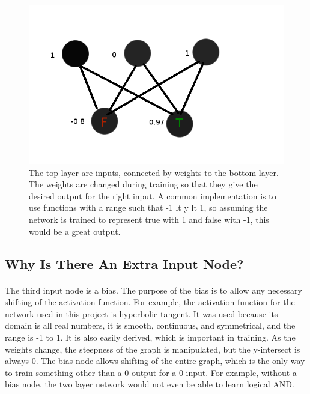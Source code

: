 \documentclass{article}
\begin{document}
    \begin{figure}
        \centering
        \includegraphics[scale=0.4]{images/perceptron.png}
        \caption{The top layer are inputs, connected by weights to the bottom 
            layer. The weights are changed during training so that they give the 
            desired output for the right input. A common implementation is to use 
            functions with a range such that -1 lt y lt 1, so assuming the network 
            is trained to represent true with 1 and false with -1, this would be 
            a great output.}
        \label{basicnetwork}
    \end{figure}

\subsection{Why Is There An Extra Input Node?}

    \paragraph{}The third input node is a bias. The purpose of the bias is 
    to allow any necessary shifting of the activation function. For example, the 
    activation function for the network used in this project is hyperbolic 
    tangent. It was used because its domain is all real numbers, it is smooth, 
    continuous, and symmetrical, and the range is -1 to 1. It is also easily 
    derived, which is important in training. As the weights change, 
    the steepness of the graph is manipulated, but the y-intersect is always 0. 
    The bias node allows shifting of the entire graph, which is the only way to 
    train something other than a 0 output for a 0 input. For example, without
    a bias node, the two layer network would not even be able to learn logical
    AND.
\end{document}

